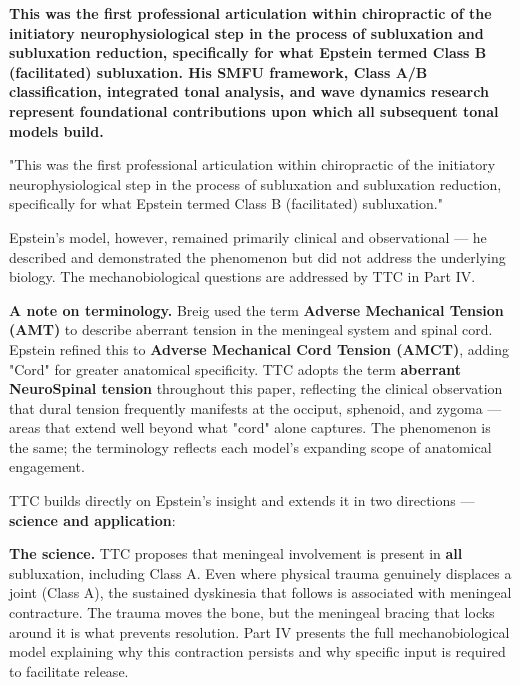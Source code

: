 \documentclass[11pt,letterpaper]{article}
\begin{document}
\textbf{This was the first professional articulation within chiropractic of the initiatory neurophysiological step in the process of subluxation and subluxation reduction, specifically for what Epstein termed Class B (facilitated) subluxation. His SMFU framework, Class A/B classification, integrated tonal analysis, and wave dynamics research represent foundational contributions upon which all subsequent tonal models build.}


\begin{pullquotebox}
"This was the first professional articulation within chiropractic of the initiatory neurophysiological step in the process of subluxation and subluxation reduction, specifically for what Epstein termed Class B (facilitated) subluxation."
\end{pullquotebox}

Epstein's model, however, remained primarily clinical and observational — he described and demonstrated the phenomenon but did not address the underlying biology. The mechanobiological questions are addressed by TTC in Part IV.


\textbf{A note on terminology.} Breig used the term \textbf{Adverse Mechanical Tension (AMT)} to describe aberrant tension in the meningeal system and spinal cord. Epstein refined this to \textbf{Adverse Mechanical Cord Tension (AMCT)}, adding "Cord" for greater anatomical specificity. TTC adopts the term \textbf{aberrant NeuroSpinal tension} throughout this paper, reflecting the clinical observation that dural tension frequently manifests at the occiput, sphenoid, and zygoma — areas that extend well beyond what "cord" alone captures. The phenomenon is the same; the terminology reflects each model's expanding scope of anatomical engagement.


TTC builds directly on Epstein's insight and extends it in two directions — \textbf{science and application}:


\textbf{The science.} TTC proposes that meningeal involvement is present in \textbf{all} subluxation, including Class A. Even where physical trauma genuinely displaces a joint (Class A), the sustained dyskinesia that follows is associated with meningeal contracture. The trauma moves the bone, but the meningeal bracing that locks around it is what prevents resolution. Part IV presents the full mechanobiological model explaining why this contraction persists and why specific input is required to facilitate release.
\end{document}
